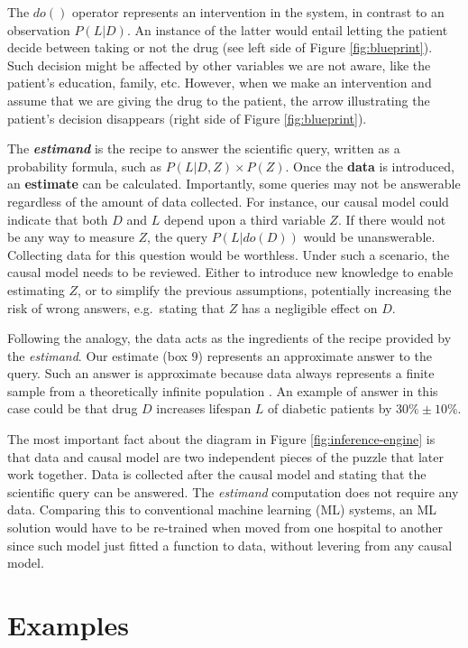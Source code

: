 \documentclass[
]{book}
\begin{document}
The \(do()\) operator represents an intervention in the system, in contrast to an observation \(P(L|D)\). An instance of the latter would entail letting the patient decide between taking or not the drug (see left side of Figure \ref{fig:blueprint}). Such decision might be affected by other variables we are not aware, like the patient's education, family, etc. However, when we make an intervention and assume that we are giving the drug to the patient, the arrow illustrating the patient's decision disappears (right side of Figure \ref{fig:blueprint}).

The \textbf{\emph{estimand}} is the recipe to answer the scientific query, written as a probability formula, such as \(P(L | D, Z) \times P(Z)\). Once the \textbf{data} is introduced, an \textbf{estimate} can be calculated. Importantly, some queries may not be answerable regardless of the amount of data collected. For instance, our causal model could indicate that both \(D\) and \(L\) depend upon a third variable \(Z\). If there would not be any way to measure \(Z\), the query \(P(L | do(D))\) would be unanswerable. Collecting data for this question would be worthless. Under such a scenario, the causal model needs to be reviewed. Either to introduce new knowledge to enable estimating \(Z\), or to simplify the previous assumptions, potentially increasing the risk of wrong answers, e.g.~stating that \(Z\) has a negligible effect on \(D\).

Following the analogy, the data acts as the ingredients of the recipe provided by the \emph{estimand}. Our estimate (box \(9\)) represents an approximate answer to the query. Such an answer is approximate because data always represents a finite sample from a theoretically infinite population \citep{book-of-why}. An example of answer in this case could be that drug \(D\) increases lifespan \(L\) of diabetic patients by \(30\% \pm 10\%\).

The most important fact about the diagram in Figure \ref{fig:inference-engine} is that data and causal model are two independent pieces of the puzzle that later work together. Data is collected after the causal model and stating that the scientific query can be answered. The \emph{estimand} computation does not require any data. Comparing this to conventional machine learning (ML) systems, an ML solution would have to be re-trained when moved from one hospital to another since such model just fitted a function to data, without levering from any causal model.

\hypertarget{examples-3}{%
\section{Examples}\label{examples-3}}
\end{document}
